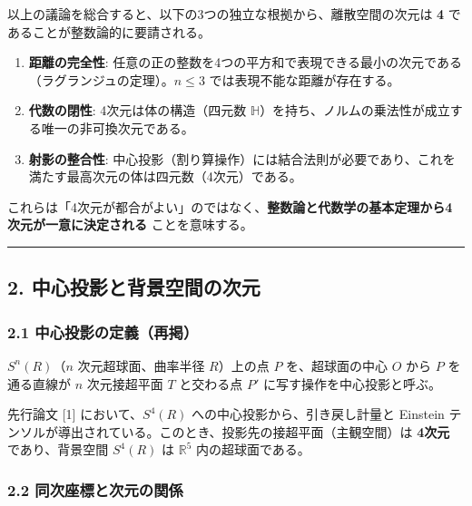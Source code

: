 \documentclass[a4paper,11pt]{ltjsarticle}
\providecommand{\tightlist}{\setlength{\itemsep}{0pt}\setlength{\parskip}{0pt}}
\begin{document}
以上の議論を総合すると、以下の3つの独立な根拠から、離散空間の次元は
\textbf{4} であることが整数論的に要請される。

\begin{enumerate}
\def\labelenumi{\arabic{enumi}.}
\tightlist
\item
  \textbf{距離の完全性}:
  任意の正の整数を4つの平方和で表現できる最小の次元である（ラグランジュの定理）。\(n \leq 3\)
  では表現不能な距離が存在する。
\item
  \textbf{代数の閉性}: 4次元は体の構造（四元数
  \(\mathbb{H}\)）を持ち、ノルムの乗法性が成立する唯一の非可換次元である。
\item
  \textbf{射影の整合性}:
  中心投影（割り算操作）には結合法則が必要であり、これを満たす最高次元の体は四元数（4次元）である。
\end{enumerate}

これらは「4次元が都合がよい」のではなく、\textbf{整数論と代数学の基本定理から4次元が一意に決定される}
ことを意味する。

\begin{center}\rule{0.5\linewidth}{0.5pt}\end{center}

\subsection{2.
中心投影と背景空間の次元}\label{ux4e2dux5fc3ux6295ux5f71ux3068ux80ccux666fux7a7aux9593ux306eux6b21ux5143}

\subsubsection{2.1
中心投影の定義（再掲）}\label{ux4e2dux5fc3ux6295ux5f71ux306eux5b9aux7fa9ux518dux63b2}

\(S^n(R)\)（\(n\) 次元超球面、曲率半径 \(R\)）上の点 \(P\)
を、超球面の中心 \(O\) から \(P\) を通る直線が \(n\) 次元接超平面 \(T\)
と交わる点 \(P'\) に写す操作を中心投影と呼ぶ。

先行論文 {[}1{]} において、\(S^4(R)\) への中心投影から、引き戻し計量と
Einstein
テンソルが導出されている。このとき、投影先の接超平面（主観空間）は
\textbf{4次元} であり、背景空間 \(S^4(R)\) は \(\mathbb{R}^5\)
内の超球面である。

\subsubsection{2.2
同次座標と次元の関係}\label{ux540cux6b21ux5ea7ux6a19ux3068ux6b21ux5143ux306eux95a2ux4fc2}
\end{document}
